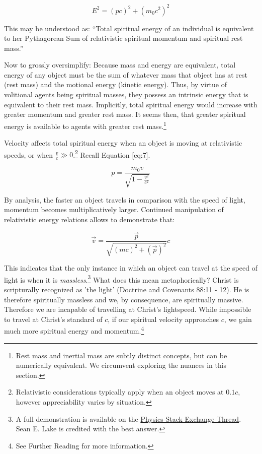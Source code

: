 \documentclass{article}
\begin{document}
                \[E^2 = (pc)^2 + (m_0c^2)^2\]

                This may be understood as: ``Total spiritual energy of an individual is equivalent to her Pythagorean Sum of relativistic spiritual momentum and spiritual rest mass.''
                 
                Now to grossly oversimplify: Because mass and energy are equivalent, total energy of any object must be the sum of whatever mass that object has at rest (rest mass) and the motional energy (kinetic energy).
                Thus, by virtue of volitional agents being spiritual masses, they possess an intrinsic energy that is equivalent to their rest mass. 
                Implicitly, total spiritual energy would increase with greater momentum and greater rest mass. It seems then, that greater spiritual energy is available to agents with greater rest mass.\footnote{Rest mass and inertial mass are subtly distinct concepts, but can be numerically equivalent. We circumvent exploring the nuances in this section.}

                Velocity affects total spiritual energy when an object is moving at relativistic speeds, or when $\tfrac{v}{c} \gg 0$.\footnote{Relativistic considerations typically apply when an object moves at $0.1c$, however appreciability varies by situation.}
                Recall Equation \ref{eq:7}. 

                \[p = \dfrac{m_0v}{\sqrt{1 - \frac{v^2}{c^2}}}\]

                By analysis, the faster an object travels in comparison with the speed of light, momentum becomes multiplicatively larger. 
                Continued manipulation of relativistic energy relations allows to demonstrate that:

                \begin{equation}\label{eq:9}
                    \vec{v} = \dfrac{\vec{p}}{\sqrt{(mc)^2 + (\vec{p})^2}}c
                \end{equation}

                This indicates that the only instance in which an object can travel at the speed of light is when it is \emph{massless}.\footnote{A full demonstration is available on the \href{https://physics.stackexchange.com/questions/289034/reason-why-only-massless-particles-can-travel-at-speed-of-light}{Physics Stack Exchange Thread}. Sean E. Lake is credited with the best answer.}
                What does this mean metaphorically? Christ is scripturally recognized as 'the light' (Doctrine and Covenants 88:11 - 12). He is therefore spiritually massless and we, by consequence, are spiritually massive.
                Therefore we are incapable of travelling at Christ's lightspeed. 
                While impossible to travel at Christ's standard of $c$, if our spiritual velocity approaches $c$, we gain much more spiritual energy and momentum.\footnote{See Further Reading for more information.}
\end{document}
